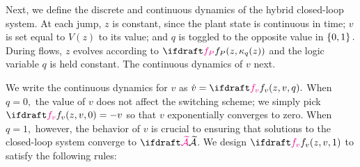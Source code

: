 Next, we define the discrete and continuous dynamics
of the hybrid closed-loop system.
At each jump, $z$ is constant, 
since the plant state is continuous in time;
$v$ is set equal to $V(z)$ to  its value; 
and $q$ is toggled to the opposite value in $\left\{0, 1 \right\}.$
During flows, $z$ evolves according to $\fp(z, \kappa_q(z))$ 
and the logic variable $q$ is held constant. 
The continuous dynamics of $v$  next.

We write the continuous dynamics for $v$ as $\dot v = \fv(z, v, q).$  
When $ q = 0,$ the value of $v$ does not affect the switching scheme;
we simply pick $\fv(z, v, 0) = -v$
so that $v$ exponentially converges to zero. %
When $q=1,$ however, the behavior of $v$ is crucial to 
ensuring that solutions to the 
closed-loop system converge to $\calAX$.
We design $\fv(z, v, 1)$
to satisfy the following rules:
